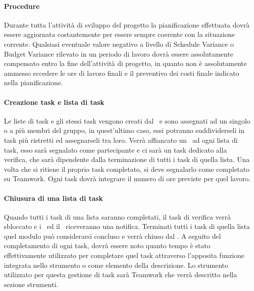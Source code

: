 \documentclass[../NormeDiProgetto_v3.0.0.tex]{subfiles}
\begin{document}
			\paragraph{Procedure}
			Durante tutta l'attività di sviluppo del progetto la pianificazione effettuata dovrà essere aggiornata costantemente per essere sempre coerente con la situazione corrente. Qualsiasi eventuale valore negativo a livello di Schedule Variance o Budget Variance rilevato in un periodo di lavoro dovrà essere assolutamente compensato entro la fine dell'attività di progetto, in quanto non è assolutamente ammesso eccedere le ore di lavoro finali e il preventivo dei costi finale indicato nella pianificazione.

			\paragraph{Creazione task e lista di task}
			Le liste di task e gli stessi task vengono creati dal \responsabilediprogetto\ e sono assegnati ad un singolo o a più membri del gruppo, in quest'ultimo caso, essi potranno suddividerseli in task più ristretti ed assegnarseli tra loro.
			Verrà affiancato un \verificatore\ ad ogni lista di task, esso sarà segnalato come partecipante e ci sarà un task dedicato alla verifica, che sarà dipendente dalla terminazione di tutti i task di quella lista.
			Una volta che si ritiene il proprio task completato, si deve segnalarlo come completato su Teamwork.
			Ogni task dovrà integrare il numero di ore previste per quel lavoro.

			\paragraph{Chiusura di una lista di task}
			Quando tutti i task di una lista saranno completati, il task di verifica verrà sbloccato e i \verificatori\ ed il \responsabilediprogetto\ riceveranno una notifica.
			Terminati tutti i task di quella lista quel modulo può considerarsi concluso e verrà chiuso dal \responsabilediprogetto.
			A seguito del completamento di ogni task, dovrà essere noto quanto tempo è stato effettivamente utilizzato per completare quel task attraverso l'apposita funzione integrata nello strumento o come elemento della descrizione.
			Lo strumento utilizzato per questa gestione di task sarà Teamwork che verrà descritto nella sezione strumenti.
		
\end{document}
